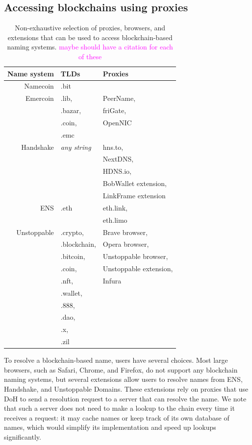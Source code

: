 \documentclass[10pt,sigconf,letterpaper]{acmart}
\newcommand{\randall}{\ding{110}\ding{43}\textcolor{magenta}}
\newcommand{\randall}{}
\begin{document}
\subsection{Accessing blockchains using proxies}

\begin{table}
	\begin{tabular}{r l l}
		\toprule
		Name system & TLDs & Proxies \\
		\midrule
		Namecoin & .bit & \\
		Emercoin & .lib, & PeerName,  \\
		& .bazar, & friGate, \\
		& .coin, & OpenNIC \\
		& .emc & \\
		Handshake & \emph{any string} & hns.to, \\
		& & NextDNS, \\
		& & HDNS.io,\\
		& & BobWallet extension, \\
		& & LinkFrame extension \\
		ENS & .eth & eth.link, \\
		& & eth.limo \\
		Unstoppable & .crypto, & Brave browser, \\
		& .blockchain, & Opera browser, \\
		& .bitcoin, & Unstoppable browser, \\
		& .coin, & Unstoppable extension, \\
		& .nft, & Infura\\
		& .wallet, & \\
		& .888, & \\
		& .dao, & \\
		& .x, & \\
		& .zil & \\
		\bottomrule
	\end{tabular}
	\caption{Non-exhaustive selection of proxies, browsers, 
	and extensions 
	that can be used to access blockchain-based naming 
	systems. \randall{maybe should have a citation for each 
	of these}}
	\label{tab:proxies_and_tlds}
\end{table}

To resolve a blockchain-based name, users have several choices. Most large 
browsers, such as Safari, Chrome, and Firefox, do not support any blockchain 
naming systems, but several extensions allow users to resolve names from ENS, 
Handshake, and Unstoppable Domains. These extensions rely on proxies that use 
DoH to send a resolution request to a server that can resolve the name. We 
note that such a server does not need to make a lookup to the chain every time 
it receives a request: it may cache names or keep track of its own database of 
names, which would simplify its implementation and speed up lookups 
significantly. 
\end{document}
